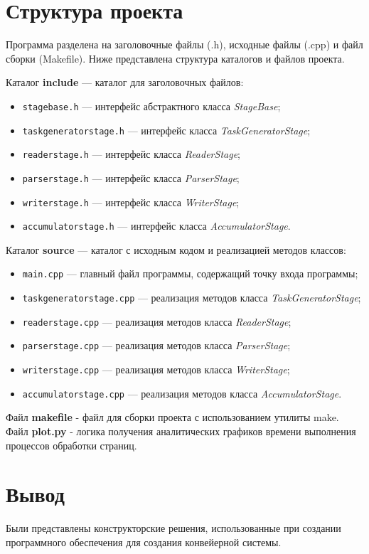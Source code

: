 \section{Структура проекта}

Программа разделена на заголовочные файлы (.h), исходные файлы (.cpp) и файл сборки (Makefile). Ниже представлена структура каталогов и файлов проекта.

Каталог \textbf{include} --- каталог для заголовочных файлов:
\begin{itemize}[label=---]
	\item \texttt{stagebase.h} --- интерфейс абстрактного класса \textit{StageBase};
	\item \texttt{taskgeneratorstage.h} --- интерфейс класса \textit{TaskGeneratorStage};
	\item \texttt{readerstage.h} --- интерфейс класса \textit{ReaderStage};
	\item \texttt{parserstage.h} --- интерфейс класса \textit{ParserStage};
	\item \texttt{writerstage.h} --- интерфейс класса \textit{WriterStage};
	\item \texttt{accumulatorstage.h} --- интерфейс класса \textit{AccumulatorStage}.
\end{itemize}
Каталог \textbf{source} --- каталог с исходным кодом и реализацией методов классов:
\begin{itemize}[label=---]
	\item \texttt{main.cpp} --- главный файл программы, содержащий точку входа программы;
	\item \texttt{taskgeneratorstage.cpp} --- реализация методов класса \textit{TaskGeneratorStage};
	\item \texttt{readerstage.cpp} --- реализация методов класса \textit{ReaderStage};
	\item \texttt{parserstage.cpp} --- реализация методов класса \textit{ParserStage};
	\item \texttt{writerstage.cpp} --- реализация методов класса \textit{WriterStage};
	\item \texttt{accumulatorstage.cpp} --- реализация методов класса \textit{AccumulatorStage}.
\end{itemize}
Файл \textbf{makefile} - файл для сборки проекта с использованием утилиты make.
Файл \textbf{plot.py} - логика получения аналитических графиков времени выполнения процессов обработки страниц.

\section{Вывод}
Были представлены конструкторские решения, использованные при создании программного обеспечения для создания конвейерной системы.
